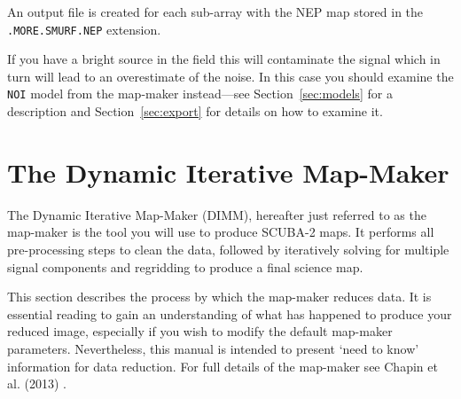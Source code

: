 \documentclass[twoside,11pt]{article}
\newcommand{\htmlref}[2]{#1}
\newcommand{\latexhtml}[2]{#1}
\newcommand{\xlabel}[1]{}
\renewcommand{\_}{\texttt{\symbol{95}}}
\newcommand{\cref}[3]{\latexhtml{#1~\ref{#2}}{\htmlref{#3}{#2}}}
\begin{document}
An output file is created for each sub-array with the NEP map stored
in the \texttt{.MORE.SMURF.NEP} extension.

If you have a bright source in the field this will contaminate the
signal which in turn will lead to an overestimate of the noise. In
this case you should examine the \texttt{NOI} model from the map-maker
instead---see \cref{Section}{sec:models}{The Individual Models} for a
description and \cref{Section}{sec:export}{Exporting individual
models} for details on how to examine it.

\clearpage
\section{\xlabel{dimm}The Dynamic Iterative Map-Maker}
\label{sec:dimm}

The Dynamic Iterative Map-Maker (DIMM), hereafter just referred to as
the map-maker is the tool you will use to produce SCUBA-2 maps. It
performs all pre-processing steps to clean the data, followed by
iteratively solving for multiple signal components and regridding to
produce a final science map.

This section describes the process by which the map-maker reduces
data. It is essential reading to gain an understanding of what has
happened to produce your reduced image, especially if you wish to
modify the default map-maker parameters. Nevertheless, this manual
is intended to present `need to know' information for data reduction.
For full details of the map-maker see Chapin et al. (2013) \cite{mapmaker}.
\end{document}
